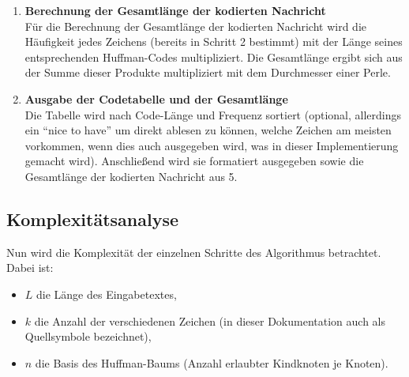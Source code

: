\documentclass[a4paper,10pt,ngerman]{scrartcl}
\begin{document}
\begin{enumerate}
  \item \textbf{Berechnung der Gesamtlänge der kodierten Nachricht} \\
  Für die Berechnung der Gesamtlänge der kodierten Nachricht wird die Häufigkeit jedes Zeichens (bereits in Schritt 2 bestimmt) mit der Länge seines entsprechenden Huffman-Codes multipliziert. Die Gesamtlänge ergibt sich aus der Summe dieser Produkte multipliziert mit dem Durchmesser einer Perle.
  \item \textbf{Ausgabe der Codetabelle und der Gesamtlänge} \\
   Die Tabelle wird nach Code-Länge und Frequenz sortiert (optional, allerdings ein “nice to have” um direkt ablesen zu können, welche Zeichen am meisten vorkommen, wenn dies auch ausgegeben wird, was in dieser Implementierung gemacht wird). Anschließend wird sie formatiert ausgegeben sowie die Gesamtlänge der kodierten Nachricht aus 5. 
\end{enumerate}


\subsection{Komplexitätsanalyse}


Nun wird die Komplexität der einzelnen Schritte des Algorithmus betrachtet. Dabei ist:
\begin{itemize}
  \item $L$ die Länge des Eingabetextes,
  \item $k$ die Anzahl der verschiedenen Zeichen (in dieser Dokumentation auch als Quellsymbole bezeichnet),
  \item $n$ die Basis des Huffman-Baums (Anzahl erlaubter Kindknoten je Knoten).
\end{itemize}

\vspace{0.2cm}
\end{document}
